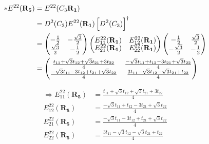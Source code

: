 \documentclass{article}
\begin{document}
\begin{align*}
	\ast E^{22}(\mathbf{R_5}) & = E^{22}(C_3\mathbf{ R_1})                                                                                                       \\
	                          & = D^2(C_3)  E^{22}(\mathbf{R_1}) \left[ D^2(C_3) \right]^\dagger                                                                 \\
	                          & =
	\begin{pmatrix}
		\renewcommand{\arraystretch}{0.72}
		-\frac{1}{2}       & -\frac{\sqrt{3}}{2} \\
		\frac{\sqrt{3}}{2} & -\frac{1}{2}
	\end{pmatrix}
	\begin{pmatrix}
		E_{11}^{22}(\mathbf{R_1}) & E_{12}^{22}(\mathbf{R_1}) \\
		E_{21}^{22}(\mathbf{R_1}) & E_{22}^{22}(\mathbf{R_1})
	\end{pmatrix}
	\begin{pmatrix}
		-\frac{1}{2}        & \frac{\sqrt{3}}{2} \\
		-\frac{\sqrt{3}}{2} & -\frac{1}{2}
	\end{pmatrix}                                                                                                     \\
	                          & = \begin{pmatrix}
		                              \frac{t_{11} + \sqrt{3}t_{12} + \sqrt{3}t_{21} + 3t_{22}}{4}  & \frac{-\sqrt{3}t_{11} + t_{12} - 3 t_{21} + \sqrt{3}t_{22}}{4} \\
		                              \frac{-\sqrt{3}t_{11} - 3t_{12} + t_{21} + \sqrt{3}t_{22}}{4} & \frac{3t_{11} - \sqrt{3}t_{12} - \sqrt{3}t_{21} + t_{22}}{4}
	                              \end{pmatrix}
\end{align*}

\begin{align*}
	\Rightarrow E_{11}^{22}(\mathbf{R_5}) & =  \frac{t_{11} + \sqrt{3}t_{12} + \sqrt{3}t_{21} + 3t_{22}}{4}  \\
	E_{12}^{22}(\mathbf{R_5})             & = \frac{-\sqrt{3}t_{11} + t_{12} - 3 t_{21} + \sqrt{3}t_{22}}{4} \\
	E_{21}^{22}(\mathbf{R_5})             & = \frac{-\sqrt{3}t_{11} - 3t_{12} + t_{21} + \sqrt{3}t_{22}}{4}  \\
	E_{22}^{22}(\mathbf{R_5})             & = \frac{3t_{11} - \sqrt{3}t_{12} - \sqrt{3}t_{21} + t_{22}}{4}   \\
\end{align*}
\end{document}
